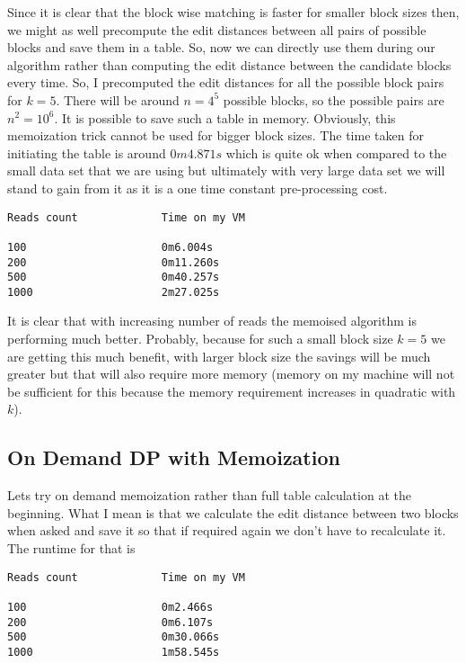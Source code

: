 \documentclass{article}
\begin{document}
            Since it is clear that the block wise matching is faster for smaller block sizes then, we might as well precompute the edit distances between all pairs of possible blocks and save them in a table. So, now we can directly use them during our algorithm rather than computing the edit distance between the candidate blocks every time. So, I precomputed the edit distances for all the possible block pairs for $k=5$. There will be around $n = 4^5$ possible blocks, so the possible pairs are $n^2 = 10^6$. It is possible to save such a table in memory. Obviously, this memoization trick cannot be used for bigger block sizes. The time taken for initiating the table is around $0m4.871s$ which is quite ok when compared to the small data set that we are using but ultimately with very large data set we will stand to gain from it as it is a one time constant pre-processing cost.
            
\begin{verbatim}
Reads count             Time on my VM

100                     0m6.004s
200                     0m11.260s
500                     0m40.257s
1000                    2m27.025s
\end{verbatim}

            It is clear that with increasing number of reads the memoised algorithm is performing much better. Probably, because for such a small block size $k=5$ we are getting this much benefit, with larger block size the savings will be much greater but that will also require more memory (memory on my machine will not be sufficient for this because the memory requirement increases in quadratic with $k$).
            
        \subsection{On Demand DP with Memoization}
        
            Lets try on demand memoization rather than full table calculation at the beginning. What I mean is that we calculate the edit distance between two blocks when asked and save it so that if required again we don't have to recalculate it. The runtime for that is
            
\begin{verbatim}
Reads count             Time on my VM

100                     0m2.466s
200                     0m6.107s
500                     0m30.066s
1000                    1m58.545s
\end{verbatim}
            
\end{document}
